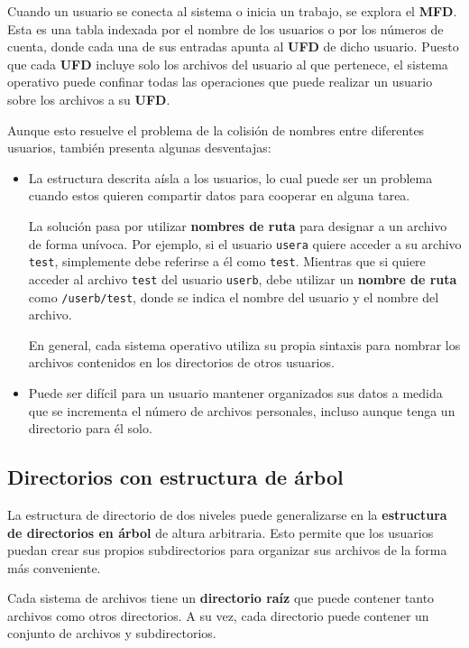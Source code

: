 Cuando un usuario se conecta al sistema o inicia un trabajo, se explora
el \textbf{MFD}. Esta es una tabla indexada por el nombre de los
usuarios o por los números de cuenta, donde cada una de sus entradas
apunta al \textbf{UFD} de dicho usuario. Puesto que cada \textbf{UFD}
incluye solo los archivos del usuario al que pertenece, el sistema
operativo puede confinar todas las operaciones que puede realizar un
usuario sobre los archivos a su \textbf{UFD}.

Aunque esto resuelve el problema de la colisión de nombres entre
diferentes usuarios, también presenta algunas desventajas:

\begin{itemize}
\item
  La estructura descrita aísla a los usuarios, lo cual puede ser un
  problema cuando estos quieren compartir datos para cooperar en alguna
  tarea.

  La solución pasa por utilizar \textbf{nombres de ruta}{} para designar
  a un archivo de forma unívoca. Por ejemplo, si el usuario
  \texttt{usera} quiere acceder a su archivo \texttt{test}, simplemente
  debe referirse a él como \texttt{test}. Mientras que si quiere acceder
  al archivo \texttt{test} del usuario \texttt{userb}, debe utilizar un
  \textbf{nombre de ruta} como \texttt{/userb/test}, donde se indica el
  nombre del usuario y el nombre del archivo.

  En general, cada sistema operativo utiliza su propia sintaxis para
  nombrar los archivos contenidos en los directorios de otros usuarios.
\item
  Puede ser difícil para un usuario mantener organizados sus datos a
  medida que se incrementa el número de archivos personales, incluso
  aunque tenga un directorio para él solo.
\end{itemize}

\subsection{Directorios con estructura de
árbol}\label{_directorios_con_estructura_de_uxe1rbol}

La estructura de directorio de dos niveles puede generalizarse en la
\textbf{estructura de directorios en árbol} de altura arbitraria. Esto
permite que los usuarios puedan crear sus propios subdirectorios para
organizar sus archivos de la forma más conveniente.

Cada sistema de archivos tiene un \textbf{directorio raíz}{} que puede
contener tanto archivos como otros directorios. A su vez, cada
directorio puede contener un conjunto de archivos y subdirectorios.

